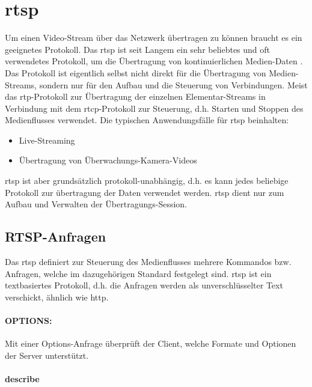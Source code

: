\section{\acl{rtsp}}
Um einen Video-Stream über das Netzwerk übertragen zu können braucht es ein geeignetes Protokoll.
Das \ac{rtsp} ist seit Langem ein sehr beliebtes und oft verwendetes Protokoll, um die Übertragung von kontinuierlichen Medien-Daten .
Das Protokoll ist eigentlich selbst nicht direkt für die Übertragung von Medien-Streams, sondern nur für den Aufbau und die Steuerung von Verbindungen.
Meist das \ac{rtp}-Protokoll zur Übertragung der einzelnen Elementar-Streams in Verbindung mit dem \ac{rtcp}-Protokoll zur Steuerung, d.h. Starten und Stoppen des Medienflusses verwendet.
Die typischen Anwendungsfälle für \ac{rtsp} beinhalten:
\begin{itemize}
    \item Live-Streaming
    \item Übertragung von Überwachungs-Kamera-Videos
\end{itemize}
\ac{rtsp} ist aber grundsätzlich protokoll-unabhängig, d.h. es kann jedes beliebige Protokoll zur übertragung der Daten verwendet werden. \ac{rtsp} dient nur zum Aufbau und Verwalten der Übertragungs-Session.

\subsection{RTSP-Anfragen}
Das \ac{rtsp} definiert zur Steuerung des Medienflusses mehrere Kommandos bzw. Anfragen, welche im dazugehörigen Standard  festgelegt sind.
\ac{rtsp} ist ein textbasiertes Protokoll, d.h. die Anfragen werden als unverschlüsselter Text verschickt, ähnlich wie \ac{http}.
\paragraph{OPTIONS:}
Mit einer Options-Anfrage überprüft der Client, welche Formate und Optionen der Server unterstützt.

\paragraph{describe}


